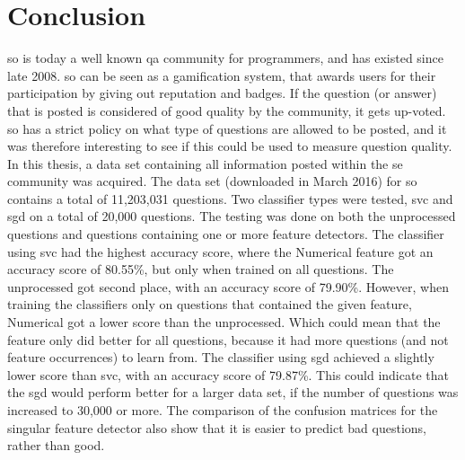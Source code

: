 \label{chap:chapter6}

\section{Conclusion}
\label{sec:conclusion}
\gls{so} is today a well known \gls{qa} community for programmers, and has existed since late 2008.
\gls{so} can be seen as a gamification system, that awards users for their participation by giving out reputation and badges. 
If the question (or answer) that is posted is considered of good quality by the community, it gets up-voted. 
\gls{so} has a strict policy on what type of questions are allowed to be posted, and it was therefore interesting to see if this could be used to measure question quality. 
\vspace{0.5em}\newline
In this thesis, a data set containing all information posted within the \gls{se} community was acquired.
The data set (downloaded in March 2016) for \gls{so} contains a total of 11,203,031 questions.
Two classifier types were tested, \gls{svc} and \gls{sgd} on a total of 20,000 questions.
The testing was done on both the unprocessed questions and questions containing one or more feature detectors.
The classifier using \gls{svc} had the highest accuracy score, where the Numerical feature got an accuracy score of 80.55\%, but only when trained on all questions. 
The unprocessed got second place, with an accuracy score of 79.90\%.
However, when training the classifiers only on questions that contained the given feature, Numerical got a lower score than the unprocessed.
Which could mean that the feature only did better  for all questions, because it had more questions (and not feature occurrences) to learn from. 
\vspace{0.5em}\newline
The classifier using \gls{sgd} achieved a slightly lower score than \gls{svc}, with an accuracy score of 79.87\%.
This could indicate that the \gls{sgd} would perform better for a larger data set, if the number of questions was increased to 30,000 or more.
The comparison of the confusion matrices for the singular feature detector also show that it is easier to predict bad questions, rather than good.


